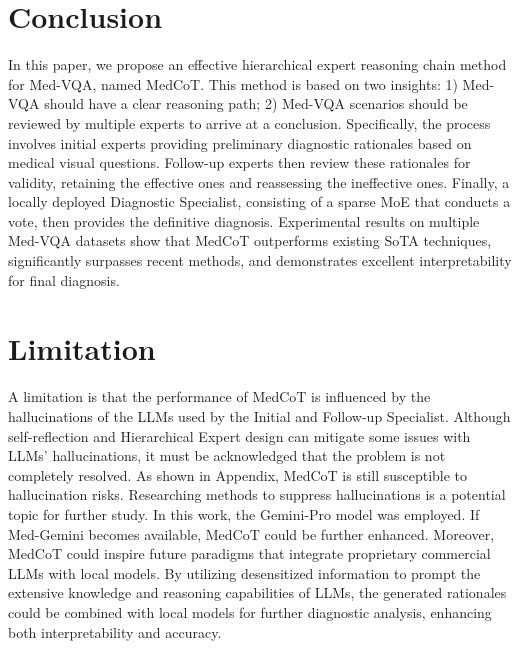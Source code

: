 \documentclass[11pt]{article}
\begin{document}
\section{Conclusion}
In this paper, we propose an effective hierarchical expert reasoning chain method for Med-VQA, named MedCoT. This method is based on two insights: 1) Med-VQA should have a clear reasoning path; 2) Med-VQA scenarios should be reviewed by multiple experts to arrive at a conclusion. Specifically, the process involves initial experts providing preliminary diagnostic rationales based on medical visual questions. Follow-up experts then review these rationales for validity, retaining the effective ones and reassessing the ineffective ones. Finally, a locally deployed Diagnostic Specialist, consisting of a sparse MoE that conducts a vote, then provides the definitive diagnosis. Experimental results on multiple Med-VQA datasets show that MedCoT outperforms existing SoTA techniques, significantly surpasses recent methods, and demonstrates excellent interpretability for final diagnosis.


\newpage
\section*{Limitation}
A limitation is that the performance of MedCoT is influenced by the hallucinations of the LLMs used by the Initial and Follow-up Specialist. 
Although self-reflection and Hierarchical Expert design can mitigate some issues with LLMs' hallucinations, it must be acknowledged that the problem is not completely resolved. As shown in Appendix, MedCoT is still susceptible to hallucination risks. Researching methods to suppress hallucinations is a potential topic for further study.
In this work, the Gemini-Pro model was employed. If Med-Gemini becomes available, MedCoT could be further enhanced.
Moreover, MedCoT could inspire future paradigms that integrate proprietary commercial LLMs with local models. 
By utilizing desensitized information to prompt the extensive knowledge and reasoning capabilities of LLMs, the generated rationales could be combined with local models for further diagnostic analysis, enhancing both interpretability and accuracy. 
\end{document}

